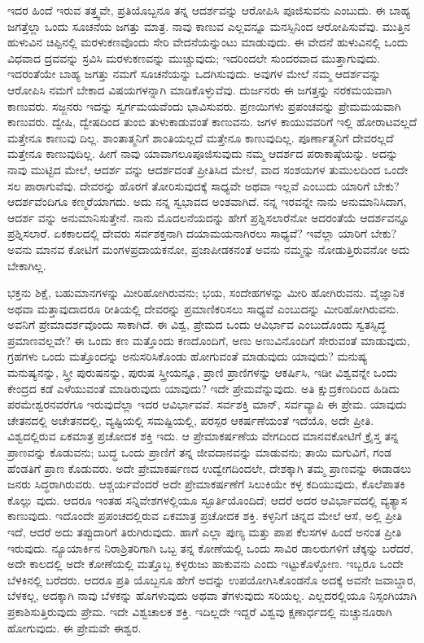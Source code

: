 ಇದರ ಹಿಂದೆ ಇರುವ ತತ್ತ್ವವೇ, ಪ್ರತಿಯೊಬ್ಬನೂ ತನ್ನ ಆದರ್ಶವನ್ನು ಆರೋಪಿಸಿ ಪೂಜಿಸುವನು ಎಂಬುದು. ಈ ಬಾಹ್ಯ ಜಗತ್ತೆಲ್ಲಾ ಒಂದು ಸೂಚನೆಯ ಜಗತ್ತು ಮಾತ್ರ. ನಾವು ಕಾಣುವ ಎಲ್ಲವನ್ನೂ ಮನಸ್ಸಿನಿಂದ ಆರೋಪಿಸುವೆವು. ಮುತ್ತಿನ ಹುಳುವಿನ ಚಿಪ್ಪಿನಲ್ಲಿ ಮರಳುಕಣವೊಂದು ಸೇರಿ ವೇದನೆಯನ್ನುಂಟು ಮಾಡುವುದು. ಈ ವೇದನೆ ಹುಳುವಿನಲ್ಲಿ ಒಂದು ವಿಧವಾದ ದ್ರವವನ್ನು ಸ್ರವಿಸಿ ಮರಳುಕಣವನ್ನು ಮುಚ್ಚುವುದು; ಇದರಿಂದಲೇ ಸುಂದರವಾದ ಮುತ್ತಾಗುವುದು. ಇದರಂತೆಯೇ ಬಾಹ್ಯ ಜಗತ್ತು ನಮಗೆ ಸೂಚನೆಯನ್ನು ಒದಗಿಸುವುದು. ಅವುಗಳ ಮೇಲೆ ನಮ್ಮ ಆದರ್ಶವನ್ನು ಆರೋಪಿಸಿ ನಮಗೆ ಬೇಕಾದ ವಿಷಯಗಳನ್ನಾಗಿ ಮಾಡಿಕೊಳ್ಳುವೆವು. ದುರ್ಜನರು ಈ ಜಗತ್ತನ್ನು ನರಕಮಯವಾಗಿ ಕಾಣುವರು. ಸಜ್ಜನರು ಇದನ್ನು ಸ್ವರ್ಗಮಯವೆಂದು ಭಾವಿಸುವರು. ಪ್ರಣಯಿಗಳು ಪ್ರಪಂಚವನ್ನು ಪ್ರೇಮಮಯವಾಗಿ ಕಾಣುವರು. ದ್ವೇಷಿ, ದ್ವೇಷದಿಂದ ತುಂಬಿ ತುಳುಕಾಡುವಂತೆ ಕಾಣುವನು. ಜಗಳ ಕಾಯುವವರಿಗೆ ಇಲ್ಲಿ ಹೋರಾಟವಲ್ಲದೆ ಮತ್ತೇನೂ ಕಾಣುವು ದಿಲ್ಲ. ಶಾಂತಾತ್ಮನಿಗೆ ಶಾಂತಿಯಲ್ಲದೆ ಮತ್ತೇನೂ ಕಾಣುವುದಿಲ್ಲ. ಪೂರ್ಣಾತ್ಮನಿಗೆ ದೇವರಲ್ಲದೆ ಮತ್ತೇನೂ ಕಾಣುವುದಿಲ್ಲ. ಹೀಗೆ ನಾವು ಯಾವಾಗಲೂಪೂಜಿಸುವುದು ನಮ್ಮ ಆದರ್ಶದ ಪರಾಕಾಷ್ಠೆಯನ್ನು. ಅದನ್ನು ನಾವು ಮುಟ್ಟಿದ ಮೇಲೆ, ಆದರ್ಶ ವನ್ನು ಆದರ್ಶದಂತೆ ಪ್ರೀತಿಸಿದ ಮೇಲೆ, ವಾದ ಸಂಶಯಗಳ ತುಮುಲದಿಂದ ಒಂದೇ ಸಲ ಪಾರಾಗುವೆವು. ದೇವರನ್ನು ಹೊರಗೆ ತೋರಿಸುವುದಕ್ಕೆ ಸಾಧ್ಯವೇ ಅಥವಾ ಇಲ್ಲವೆ ಎಂಬುದು ಯಾರಿಗೆ ಬೇಕು? ಆದರ್ಶವೆಂದಿಗೂ ಕಣ್ಮರೆಯಾಗದು. ಅದು ನನ್ನ ಸ್ವಭಾವದ ಅಂಶವಾಗಿದೆ. ನನ್ನ ಇರವನ್ನೇ ನಾನು ಅನುಮಾನಿಸಿದಾಗ, ಆದರ್ಶ ವನ್ನು ಅನುಮಾನಿಸುತ್ತೇನೆ. ನಾನು ಮೊದಲನೆಯದನ್ನು ಹೇಗೆ ಪ್ರಶ್ನಿಸಲಾರೆನೋ ಅದರಂತೆಯೆ ಆದರ್ಶವನ್ನೂ ಪ್ರಶ್ನಿಸಲಾರೆ. ಏಕಕಾಲದಲ್ಲಿ ದೇವರು ಸರ್ವಶಕ್ತನಾಗಿ ದಯಾಮಯನಾಗಿರಲು ಸಾಧ್ಯವೆ? ಇವೆಲ್ಲಾ ಯಾರಿಗೆ ಬೇಕು? ಅವನು ಮಾನವ ಕೋಟಿಗೆ ಮಂಗಳಪ್ರದಾಯಕನೋ, ಪ್ರಜಾಪೀಡಕನಂತೆ ಅವನು ನಮ್ಮನ್ನು ನೋಡುತ್ತಿರುವನೋ ಅದು ಬೇಕಾಗಿಲ್ಲ.

ಭಕ್ತನು ಶಿಕ್ಷೆ, ಬಹುಮಾನಗಳನ್ನು ಮೀರಿಹೋಗಿರುವನು; ಭಯ, ಸಂದೇಹಗಳನ್ನು ಮೀರಿ ಹೋಗಿರುವನು. ವೈಜ್ಞಾನಿಕ ಅಥವಾ ಮತ್ತಾವುದಾದರೂ ರೀತಿಯಲ್ಲಿ ದೇವರನ್ನು ಪ್ರಮಾಣಿಕರಿಸಲು ಸಾಧ್ಯವೆ ಎಂಬುದನ್ನು ಮೀರಿಹೋಗಿರುವನು. ಅವನಿಗೆ ಪ್ರೇಮಾದರ್ಶವೊಂದು ಸಾಕಾಗಿದೆ. ಈ ವಿಶ್ವ, ಪ್ರೇಮದ ಒಂದು ಆವಿರ್ಭಾವ ಎಂಬುದೊಂದು ಸ್ವತಸ್ಸಿದ್ಧ ಪ್ರಮಾಣವಲ್ಲವೇ? ಈ ಒಂದು ಕಣ ಮತ್ತೊಂದು ಕಣದೊಂದಿಗೆ, ಅಣು ಅಣುವಿನೊಂದಿಗೆ ಸೇರುವಂತೆ ಮಾಡುವುದು, ಗ್ರಹಗಳು ಒಂದು ಮತ್ತೊಂದನ್ನು ಅನುಸರಿಸಿಕೊಂಡು ಹೋಗುವಂತೆ ಮಾಡುವುದು ಯಾವುದು? ಮನುಷ್ಯ ಮನುಷ್ಯನನ್ನು, ಸ್ತ್ರೀ ಪುರುಷನನ್ನು, ಪುರುಷ ಸ್ತ್ರೀಯನ್ನೂ, ಪ್ರಾಣಿ ಪ್ರಾಣಿಗಳನ್ನು ಆಕರ್ಷಿಸಿ, ಇಡೀ ವಿಶ್ವವನ್ನೇ ಒಂದು ಕೇಂದ್ರದ ಕಡೆ ಎಳೆಯುವಂತೆ ಮಾಡಿರುವುದು ಯಾವುದು? ಇದೇ ಪ್ರೇಮವೆನ್ನುವುದು. ಅತಿ ಕ್ಷುದ್ರಕಣದಿಂದ ಹಿಡಿದು ಪರಮೇಶ್ವರನವರೆಗೂ ಇರುವುದೆಲ್ಲಾ ಇದರ ಆವಿರ್ಭಾವವೆ. ಸರ್ವಶಕ್ತಿ ಮಾನ್​, ಸರ್ವವ್ಯಾಪಿ ಈ ಪ್ರೇಮ. ಯಾವುದು ಚೇತನದಲ್ಲಿ ಅಚೇತನದಲ್ಲಿ, ವ್ಯಷ್ಟಿಯಲ್ಲಿ ಸಮಷ್ಟಿಯಲ್ಲಿ, ಪರಸ್ಪರ ಆಕರ್ಷಣೆಯಂತೆ ಇದೆಯೊ, ಅದೇ ಪ್ರೀತಿ. ವಿಶ್ವದಲ್ಲಿರುವ ಏಕಮಾತ್ರ ಪ್ರಚೋದಕ ಶಕ್ತಿ ಇದು. ಆ ಪ್ರೇಮಾಕರ್ಷಣೆಯ ವೇಗದಿಂದ ಮಾನವಕೋಟಿಗೆ ಕ್ರೈಸ್ತ ತನ್ನ ಪ್ರಾಣವನ್ನು ಕೊಡುವನು; ಬುದ್ಧ ಒಂದು ಪ್ರಾಣಿಗೆ ತನ್ನ ಜೀವದಾನವನ್ನು ಮಾಡುವನು; ತಾಯಿ ಮಗುವಿಗೆ, ಗಂಡ ಹೆಂಡತಿಗೆ ಪ್ರಾಣ ಕೊಡುವರು. ಅದೇ ಪ್ರೇಮಾಕರ್ಷಣದ ಉದ್ವೇಗದಿಂದಲೇ, ದೇಶಕ್ಕಾಗಿ ತಮ್ಮ ಪ್ರಾಣವನ್ನು ಈಡಾಡಲು ಜನರು ಸಿದ್ಧರಾಗಿರುವರು. ಆಶ್ಚರ್ಯವೆಂದರೆ ಅದೇ ಪ್ರೇಮಾಕರ್ಷಣೆಗೆ ಸಿಲುಕಿಯೇ ಕಳ್ಳ ಕದಿಯುವುದು, ಕೊಲೆಪಾತಕಿ ಕೊಲ್ಲು ವುದು. ಆದರೂ ಇಂತಹ ಸನ್ನಿವೇಶಗಳಲ್ಲಿಯೂ ಸ್ಫೂರ್ತಿಯೊಂದಿದೆ; ಆದರೆ ಅದರ ಆವಿರ್ಭಾವದಲ್ಲಿ ವ್ಯತ್ಯಾಸ ಕಾಣುವುದು. ಇದೊಂದೇ ಪ್ರಪಂಚದಲ್ಲಿರುವ ಏಕಮಾತ್ರ ಪ್ರಚೋದಕ ಶಕ್ತಿ. ಕಳ್ಳನಿಗೆ ಚಿನ್ನದ ಮೇಲೆ ಆಸೆ, ಅಲ್ಲಿ ಪ್ರೀತಿ ಇದೆ, ಆದರೆ ಅದು ತಪ್ಪುದಾರಿಗೆ ತಿರುಗಿರುವುದು. ಹಾಗೆ ಎಲ್ಲಾ ಪುಣ್ಯ ಮತ್ತು ಪಾಪ ಕೆಲಸಗಳ ಹಿಂದೆ ಅನಂತ ಪ್ರೀತಿ ಇರುವುದು. ನ್ಯೂಯಾರ್ಕಿನ ನಿರಾಶ್ರಿತರಿಗಾಗಿ ಒಬ್ಬ ತನ್ನ ಕೋಣೆಯಲ್ಲಿ ಒಂದು ಸಾವಿರ ಡಾಲರುಗಳಿಗೆ ಚೆಕ್ಕನ್ನು ಬರೆದರೆ, ಅದೇ ಕಾಲದಲ್ಲಿ ಅದೇ ಕೋಣೆಯಲ್ಲಿ ಮತ್ತೊಬ್ಬ ಕಳ್ಳರುಜು ಹಾಕುವನು ಎಂದು ಇಟ್ಟುಕೊಳ್ಳೋಣ. ಇಬ್ಬರೂ ಒಂದೇ ಬೆಳಕಿನಲ್ಲಿ ಬರೆದರು. ಆದರೂ ಪ್ರತಿ ಯೊಬ್ಬನೂ ಹೇಗೆ ಅದನ್ನು ಉಪಯೋಗಿಸಿಕೊಂಡನೊ ಅದಕ್ಕೆ ಅವನೇ ಜವಾಬ್ದಾರ, ಬೆಳಕಲ್ಲ, ಅದಕ್ಕಾಗಿ ನಾವು ಬೆಳಕನ್ನು ಹೊಗಳುವುದು ಅಥವಾ ತೆಗಳುವುದು ಸರಿಯಲ್ಲ. ಎಲ್ಲದರಲ್ಲಿಯೂ ನಿಸ್ಸಂಗಿಯಾಗಿ ಪ್ರಕಾಶಿಸುತ್ತಿರುವುದು ಪ್ರೇಮ. ಇದೇ ವಿಶ್ವಚಾಲಕ ಶಕ್ತಿ. ಇದಿಲ್ಲದೇ ಇದ್ದರೆ ವಿಶ್ವವು ಕ್ಷಣಾರ್ಧದಲ್ಲಿ ನುಚ್ಚುನೂರಾಗಿ ಹೋಗುವುದು. ಈ ಪ್ರೇಮವೇ ಈಶ್ವರ.

